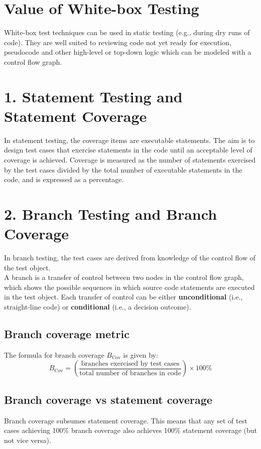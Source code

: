 \documentclass{article}
\begin{document}
\begin{multicols}{3}
{\section*{Value of White-box Testing}
White-box test techniques can be used in static testing (e.g., during dry runs of code). They are well suited to reviewing code not yet ready for execution, pseudocode and other high-level or top-down logic which can be modeled with a control flow graph.\\

\section*{1. Statement Testing and Statement Coverage}
In statement testing, the coverage items are executable statements. The aim is to design test cases that exercise statements in the code until an acceptable level of coverage is achieved. Coverage is measured as the number of statements exercised by the test cases divided by the total number of executable statements in the code, and is expressed as a percentage.\\

\section*{2. Branch Testing and Branch Coverage}
In branch testing, the test cases are derived from knowledge of the control flow of the test object.\\
A branch is a transfer of control between two nodes in the control flow graph, which shows the possible sequences in which source code statements are executed in the test object. Each transfer of control can be either \textbf{unconditional} (i.e., straight-line code) or \textbf{conditional} (i.e., a decision outcome).\\

\subsection*{Branch coverage metric}
The formula for branch coverage $B_{\text{Cov}}$ is given by:
\begin{equation*}
    B_{\text{Cov}} = \left( \frac{\text{branches exercised by test cases}}{\text{total number of branches in code}} \right) \times 100\% 
    \end{equation*}

\subsection*{Branch coverage vs statement coverage}
Branch coverage subsumes statement coverage. This means that any set of test cases achieving 100\% branch coverage also achieves 100\% statement coverage (but not vice versa).\\

}
\end{multicols}
\end{document}

